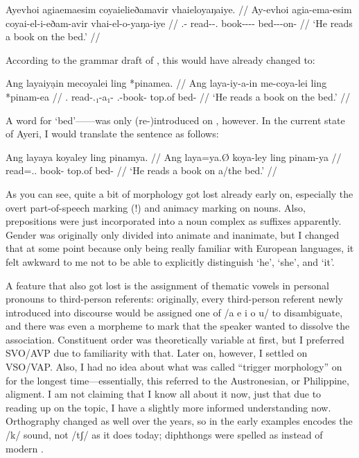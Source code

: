\ex\begingl
	\gla Ayevhoi agiaemaesim coyaielieðamavir vhaieloyaŋaiye. //
	\glb Ay-evhoi agia-ema-esim coyai-el-i-eðam-avir vhai-el-o-yaŋa-iye //
	\glc \Tsg{}.\An{}-\Sbj{} read-\Vb{}-\Sbj{}.\An{} 
		book-\Nn{}-\An{}-\Indf{}-\Parg{} bed-\Nn{}-\Inan{}-on-\Loc{} //
	\glft `He reads a book on the bed.' //
\endgl\xe

According to the grammar draft of , this would have already 
changed to:

\ex\begingl
	\gla Ang layaiyạin mecoyalei ling *pinamea. //
	\glb Ang laya-iy-a-in me-coya-lei ling *pinam-ea //
	\glc \Aarg{}.\Sbj{} read-\Tsg{}.\An{}₁-a₁-\Sbj{} 
		\Indf{}.\Inan{}-book-\PargI{} top.of bed-\Loc{} //
	\glft `He reads a book on the bed.' //
\endgl\xe

A word for `bed'------was only (re-)introduced on 
, however. In the current state of Ayeri, I would translate 
the sentence as follows:

\ex\begingl
	\gla Ang layaya koyaley ling pinamya. //
	\glb Ang laya=ya.Ø koya-ley ling pinam-ya //
	\glc \AgtT{} read=\Tsg{}.\M{}.\Top{} book-\PargI{} top.of bed-\Loc{} //
	\glft `He reads a book on a/the bed.' //
\endgl\xe

As you can see, quite a bit of morphology got lost already early on, especially 
the overt part-of-speech marking (!) and animacy marking on nouns. Also, 
prepositions were just incorporated into a noun complex as suffixes apparently. 
Gender was originally only divided into animate and inanimate, but I changed 
that at some point because only being really familiar with European languages, 
it felt awkward to me not to be able to explicitly distinguish `he', `she', and 
`it'.

A feature that also got lost is the assignment of thematic vowels in personal 
pronouns to third-person referents: originally, every third-person referent 
newly introduced into discourse would be assigned one of /a e i o u/ to 
disambiguate, and there was even a morpheme to mark that the speaker wanted to 
dissolve the association. Constituent order was theoretically variable at first, 
but I preferred SVO/AVP due to familiarity with that. Later on, however, I 
settled on VSO/VAP. Also, I had no idea about what was called 
``trigger morphology'' on  for the longest time---essentially, 
this referred to the Austronesian, or Philippine, aligment. I am not claiming 
that I know all about it now, just that due to reading up on the topic, I have 
a slightly more informed understanding now. Orthography changed as well over 
the years, so  in the early examples encodes the /k/ sound, not /tʃ/ as 
it does today; diphthongs were spelled as  instead of modern .


